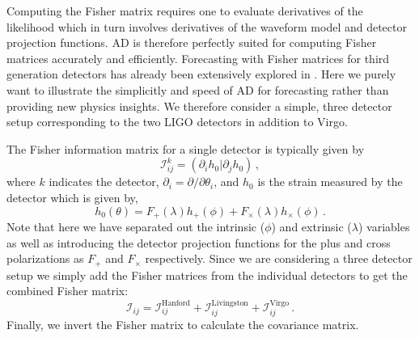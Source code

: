 \documentclass[twocolumn]{aastex631}
\begin{document}
Computing the Fisher matrix requires one to evaluate derivatives of the likelihood which in turn involves derivatives of the waveform model and detector projection functions.
AD is therefore perfectly suited for computing Fisher matrices accurately and efficiently. 
Forecasting with Fisher matrices for third generation detectors has already been extensively explored in \citep{Iacovelli:2022bbs, Iacovelli:2022mbg}.
Here we purely want to illustrate the simplicitly and speed of AD for forecasting rather than providing new physics insights.
We therefore consider a simple, three detector setup corresponding to the two LIGO detectors in addition to Virgo.

The Fisher information matrix for a single detector is typically given by 
\begin{equation}
    \label{eq:fisher}
    \mathcal{I}^{k}_{ij} = (\partial_i h_0 | \partial_j h_0) \, ,
\end{equation}
where $k$ indicates the detector, $\partial_i = \partial/\partial \theta_i$, and $h_0$ is the strain measured by the detector which is given by,
\begin{equation}
    h_0(\theta) = F_+(\lambda) h_{+}(\phi) + F_\times(\lambda) h_{\times}(\phi) \, .
\end{equation}
Note that here we have separated out the intrinsic ($\phi$) and extrinsic ($\lambda$) variables as well as introducing the detector projection functions for the plus and cross polarizations as $F_+$ and $F_\times$ respectively.
Since we are considering a three detector setup we simply add the Fisher matrices from the individual detectors to get the combined Fisher matrix:
\begin{equation}
    \mathcal{I}_{ij} =  \mathcal{I}^{\mathrm{Hanford}}_{ij} + \mathcal{I}^{\mathrm{Livingston}}_{ij} + \mathcal{I}^{\mathrm{Virgo}}_{ij}   \, .
\end{equation}
Finally, we invert the Fisher matrix to calculate the covariance matrix.

\end{document}
